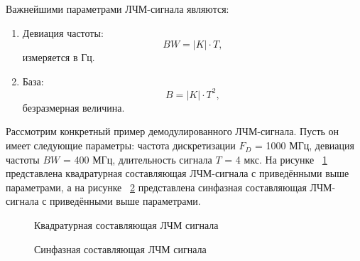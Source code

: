 \documentclass[a4paper,oneside ,14pt]{extreport}
\begin{document}
Важнейшими параметрами ЛЧМ-сигнала являются:

\begin{enumerate}
	\item Девиация частоты: 
\begin{equation}
	BW = |K| \cdot T, 
\end{equation}
измеряется в Гц.
	\item База: 
\begin{equation}
	B = |K| \cdot T^2, 
\end{equation}
безразмерная величина.
\end{enumerate}

Рассмотрим конкретный пример демодулированного ЛЧМ-сигнала. Пусть он имеет следующие параметры: частота дискретизации \(F_{D}\) = 1000 МГц, девиация частоты \(BW\) = 400 МГц, длительность сигнала \(T\) = 4 мкс. На рисунке ~\ref{fig:chirp_q} представлена квадратурная составляющая ЛЧМ-сигнала с приведёнными выше параметрами, а на рисунке ~\ref{fig:chirp_i} представлена синфазная составляющая ЛЧМ-сигнала с приведёнными выше параметрами.

\begin{figure}[h]
    \centering
    \noindent
    \caption{Квадратурная составляющая ЛЧМ сигнала}
    \label{fig:chirp_q}
\end{figure}

\begin{figure}[h]
    \centering
    \noindent
    \caption{Синфазная составляющая ЛЧМ сигнала}
    \label{fig:chirp_i}
\end{figure}
\end{document}
